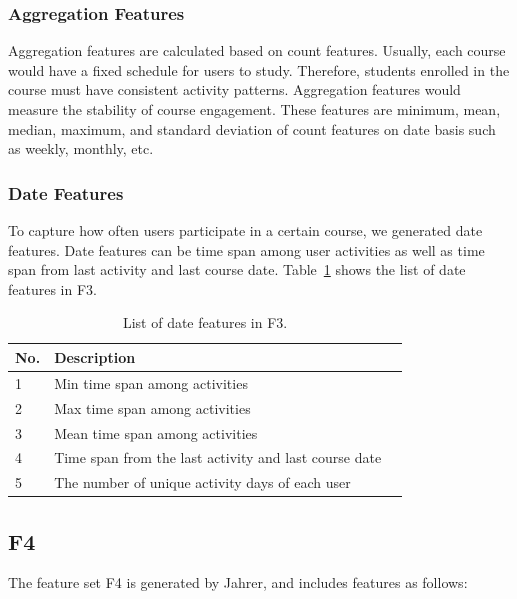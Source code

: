 \subsubsection{Aggregation Features}
Aggregation features are calculated based on count features. Usually, each course would have a fixed schedule for users to study. Therefore, students enrolled in the course must have consistent activity patterns.  Aggregation features would measure the stability of course engagement.  These features are minimum, mean, median, maximum, and standard deviation of count features on date basis such as weekly, monthly, etc.

\subsubsection{Date Features}
To capture how often users participate in a certain course, we generated date features. Date features can be time span among user activities as well as time span from last activity and last course date. Table~\ref{tb:tnfeature3} shows the list of date features in F3. 

\begin{center}
	\begin{table}[ht]
		\begin{minipage}{0.5 \textwidth}
			{
							\caption{List of date features in F3.}
				\small
				\hfill{}
				\begin{tabular}{|l|l|l|}
					\hline
					\textbf{No.}	&\textbf{Description}\tabularnewline \hline
					1 			& Min time span among activities \tabularnewline
					2 			& Max time span among activities \tabularnewline
					3 			& Mean time span among activities \tabularnewline
					4 			& Time span from the last activity and last course date \tabularnewline
					5 			& The number of unique activity days of each user \tabularnewline
					\hline
				\end{tabular}
			}
			\hfill{}
			\label{tb:tnfeature3}
		\end{minipage}
	\end{table}
\end{center}

\subsection{F4}
The feature set F4 is generated by Jahrer, and includes features as follows:


